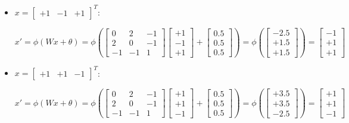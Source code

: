 \documentclass[letterpaper,headings=standardclasses]{scrartcl}
\begin{document}
\begin{itemize}
    \item $x = [\begin{matrix} +1 & -1 & +1 \end{matrix}]^T$:
    
    $$ x' = \phi(Wx + \theta) = \phi \left( \left[ \begin{matrix} 0 & 2 & -1 \\ 2 & 0 & -1 \\ -1 & -1 & 1 \end{matrix} \right] \left[ \begin{matrix} +1 \\ -1 \\ +1 \end{matrix} \right] + \left[ \begin{matrix} 0.5 \\ 0.5 \\ 0.5 \end{matrix} \right] \right) = \phi \left( \left[ \begin{matrix} -2.5 \\ +1.5 \\ +1.5 \end{matrix} \right] \right) = \left[ \begin{matrix} -1 \\ +1 \\ +1 \end{matrix} \right] $$

    \item $x = [\begin{matrix} +1 & +1 & -1 \end{matrix}]^T$:
    
    $$ x' = \phi(Wx + \theta) = \phi \left( \left[ \begin{matrix} 0 & 2 & -1 \\ 2 & 0 & -1 \\ -1 & -1 & 1 \end{matrix} \right] \left[ \begin{matrix} +1 \\ +1 \\ -1 \end{matrix} \right] + \left[ \begin{matrix} 0.5 \\ 0.5 \\ 0.5 \end{matrix} \right] \right) = \phi \left( \left[ \begin{matrix} +3.5 \\ +3.5 \\ -2.5 \end{matrix} \right] \right) = \left[ \begin{matrix} +1 \\ +1 \\ -1 \end{matrix} \right] $$
    

\end{itemize}
\end{document}
